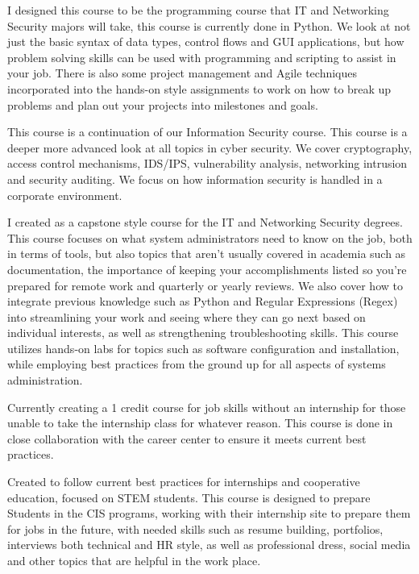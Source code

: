 {
{I designed this course to be the programming course that IT and Networking Security majors will take, this course is currently done in Python.  We look at not just the basic syntax of data types, control flows and GUI applications, but how problem solving skills can be used with programming and scripting to assist in your job.  There is also some project management and Agile techniques incorporated into the hands-on style assignments to work on how to break up problems and plan out your projects into milestones and goals.}


{This course is a continuation of our Information Security course.  This course is a deeper more advanced look at all topics in cyber security.  We cover cryptography, access control mechanisms, IDS/IPS, vulnerability analysis, networking intrusion and security auditing.  We focus on how information security is handled in a corporate environment.}

{I created as a capstone style course for the IT and Networking Security degrees.  This course focuses on what system administrators need to know on the job, both in terms of tools, but also topics that aren’t usually covered in academia such as documentation, the importance of keeping your accomplishments listed so you’re prepared for remote work and quarterly or yearly reviews. We also cover how to integrate previous knowledge such as Python and Regular Expressions (Regex) into streamlining your work and seeing where they can go next based on individual interests, as well as strengthening troubleshooting skills. This course utilizes hands-on labs for topics such as software configuration and installation, while employing best practices from the ground up for all aspects of systems administration. }


{Currently creating a 1 credit course for job skills without an internship for those unable to take the internship class for whatever reason.  This course is done in close collaboration with the career center to ensure it meets current best practices.}

{Created to follow current best practices for internships and cooperative education, focused on STEM students. This course is designed to prepare Students in the CIS programs, working with their internship site to prepare them for jobs in the future, with needed skills such as resume building, portfolios, interviews both technical and HR style, as well as professional dress, social media and other topics that are helpful in the work place.}
}



